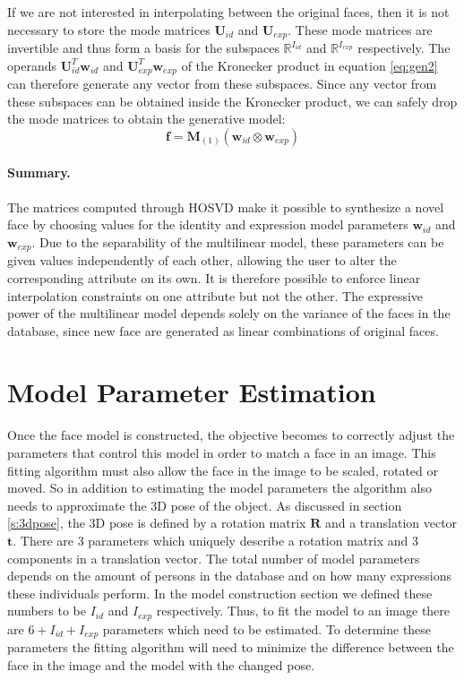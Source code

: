\documentclass[11pt,a4paper,twoside]{report}
\begin{document}
If we are not interested in interpolating between the original faces, then it is
not necessary to store the mode matrices $\mathbf{U}_{id}$ and
$\mathbf{U}_{exp}$. These mode matrices are invertible and thus form a
basis for the subspaces $\mathbb{R}^{I_{id}}$ and $\mathbb{R}^{I_{exp}}$
respectively. The operands $\mathbf{U}_{id}^T\mathbf{w}_{id}$ and 
$\mathbf{U}_{exp}^T\mathbf{w}_{exp}$ of the Kronecker product in equation \ref{eq:gen2}
can therefore generate any vector from these subspaces. Since any vector from these
subspaces can be obtained inside the Kronecker product, we can safely drop the mode matrices to obtain the generative model:
\begin{equation}\label{eq:gen4}
\mathbf{f} = \mathbf{M}_{(1)}(\mathbf{w}_{id} \otimes \mathbf{w}_{exp})
\end{equation}
\paragraph{Summary.} The matrices computed through HOSVD make it possible to synthesize a novel face by
choosing values for the identity and expression model parameters $\mathbf{w}_{id}$ and
$\mathbf{w}_{exp}$. Due to the separability of the multilinear model, these
parameters can be given values independently of each other, allowing the user to alter the
corresponding attribute on its own. It is therefore possible to enforce
linear interpolation constraints on one attribute but not the other. The expressive power of the multilinear model depends solely on the
variance of the faces in the database, since new face are generated as linear
combinations of original faces.

\section{Model Parameter Estimation}
Once the face model is constructed, the objective becomes to correctly adjust the
parameters that control this model in order to match a face in an
image. This fitting algorithm must also allow the face in the image to be scaled,
rotated or moved. So in addition to estimating the model parameters the
algorithm also needs to
approximate the 3D pose of the object. As discussed in section \ref{s:3dpose},
the 3D pose is defined by a rotation matrix $\mathbf{R}$ and a translation
vector $\mathbf{t}$. There are 3 parameters which uniquely describe a rotation
matrix and 3 components in a translation vector. The total number of model parameters depends on
the amount of persons in the database and on how many expressions these
individuals perform. In the model construction section we defined these numbers
to be $I_{id}$ and $I_{exp}$ respectively. Thus, to fit the model to an image there
are $6+I_{id}+I_{exp}$ parameters which need to be estimated. To determine
these parameters the fitting algorithm will need to minimize the difference
between the face in the image and the model with the changed pose.
\end{document}
